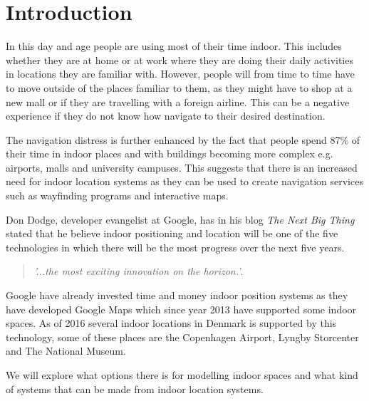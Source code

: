 \chapter{Introduction}
In this day and age people are using most of their time indoor. This includes whether they are at home or at work where they are doing their daily activities in locations they are familiar with. However, people will from time to time have to move outside of the places  familiar to them, as they might have to shop at a new mall or if they are travelling with a foreign airline. This can be a negative experience if they do not know how navigate to their desired destination. 

The navigation distress is further enhanced by the fact that people spend 87\% of their time in indoor places and with buildings becoming more complex e.g. airports, malls and university campuses\cite{klepeis2001national}. This suggests that there is an increased need for indoor location systems as they can be used to create navigation services such as wayfinding programs and interactive maps. %

Don Dodge, developer evangelist at Google, has in his blog \textit{The Next Big Thing} stated that he believe indoor positioning and location will be one of the five technologies in which there will be the most progress over the next five years\cite{DonDIndoorIsNext}.
\begin{quotation}
	\textit{'...the most exciting innovation on the horizon.'}\cite{DonDNextBigThing}.
\end{quotation}
Google have already invested time and money indoor position systems as they have developed Google Maps which since year 2013 have supported some indoor spaces\cite{google_indoor}. As of 2016 several indoor locations in Denmark is supported by this technology, some of these places are the Copenhagen Airport, Lyngby Storcenter and The National Museum\cite{google_dk}.

We will explore what options there is for modelling indoor spaces and what kind of systems that can be made from indoor location systems.